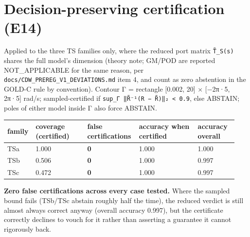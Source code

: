 \documentclass[10pt,a4paper]{article}
\begin{document}
\section{Decision-preserving certification (E14)}
Applied to the three TS families only, where the reduced port matrix \texttt{T̃\_\allowbreak{}S(s)} shares the full model's dimension (theory note; GM/POD are reported NOT\_APPLICABLE for the same reason, per \texttt{docs/\allowbreak{}CDW\_\allowbreak{}PREREG\_\allowbreak{}V1\_\allowbreak{}DEVIATIONS.md} item 4, and count as zero abstention in the GOLD-C rule by convention). Contour Γ = rectangle [0.002, 20] × [−2π·5, 2π·5] rad/s; sampled-certified if \texttt{sup\_\allowbreak{}Γ ‖R̃⁻¹(R − R̃)‖₂ < 0.9}, else ABSTAIN; poles of either model inside Γ also force ABSTAIN.

{\small
\begin{longtable}{L{0.066\linewidth}L{0.221\linewidth}L{0.221\linewidth}L{0.254\linewidth}L{0.177\linewidth}}
\toprule
\textbf{family} & \textbf{coverage (certified)} & \textbf{false certifications} & \textbf{accuracy when certified} & \textbf{accuracy overall} \\
\midrule
\endhead
TSa & 1.000 & \textbf{0} & 1.000 & 1.000 \\
TSb & 0.506 & \textbf{0} & 1.000 & 0.997 \\
TSc & 0.472 & \textbf{0} & 1.000 & 0.997 \\
\bottomrule
\end{longtable}}
\textbf{Zero false certifications across every case tested.} Where the sampled bound fails (TSb/TSc abstain roughly half the time), the reduced verdict is still almost always correct anyway (overall accuracy 0.997), but the certificate correctly declines to vouch for it rather than asserting a guarantee it cannot rigorously back.
\end{document}
